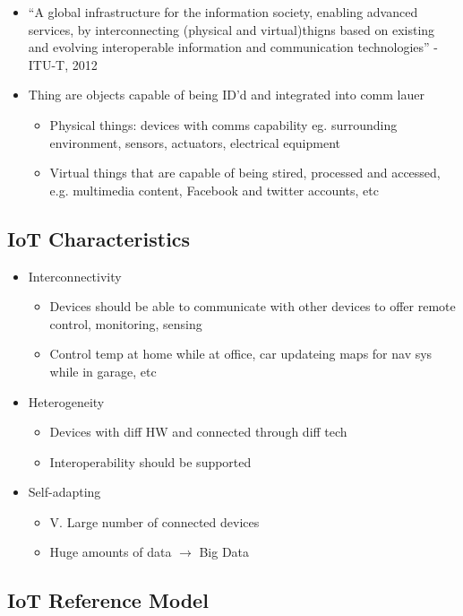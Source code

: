 \begin{itemize}
	\item ``A global infrastructure for the information society, enabling
		advanced services, by interconnecting (physical and
		virtual)thigns based on existing and evolving interoperable
		information and communication technologies'' - ITU-T, 2012
	\item Thing are objects capable of being ID'd and integrated into comm
		lauer
	\begin{itemize}
		\item Physical things: devices with comms capability eg.
			surrounding environment, sensors, actuators, electrical
			equipment
		\item Virtual things that are capable of being stired, processed
			and accessed, e.g. multimedia content, Facebook and
			twitter accounts, etc
	\end{itemize}
\end{itemize}

\subsection{IoT Characteristics}

\begin{itemize}
	\item Interconnectivity
	\begin{itemize}
		\item Devices should be able to communicate with other devices
			to offer remote control, monitoring, sensing
		\item Control temp at home while at office, car updateing maps
			for nav sys while in garage, etc
	\end{itemize}
	\item Heterogeneity
	\begin{itemize}
		\item Devices with diff HW and connected through diff tech
		\item Interoperability should be supported
	\end{itemize}
	\item Self-adapting
	\begin{itemize}
		\item V. Large number of connected devices
		\item Huge amounts of data $\to$ Big Data
	\end{itemize}
\end{itemize}

\subsection{IoT Reference Model}

